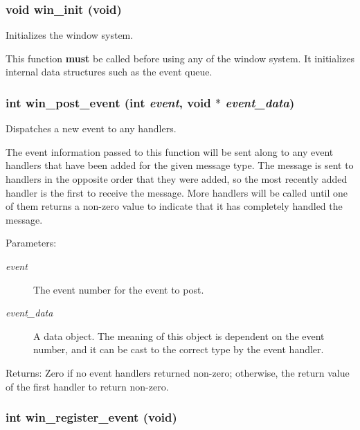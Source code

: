 \subsubsection{\setlength{\rightskip}{0pt plus 5cm}void win\_\-init (void)}\label{winevent_8h_a2}


Initializes the window system. 

This function {\bf must} be called before using any of the window system. It initializes internal data structures such as the event queue. 
\subsubsection{\setlength{\rightskip}{0pt plus 5cm}int win\_\-post\_\-event (int {\em event}, void $\ast$ {\em event\_\-data})}\label{winevent_8h_a4}


Dispatches a new event to any handlers. 

The event information passed to this function will be sent along to any event handlers that have been added for the given message type. The message is sent to handlers in the opposite order that they were added, so the most recently added handler is the first to receive the message. More handlers will be called until one of them returns a non-zero value to indicate that it has completely handled the message.

\begin{Desc}
\item[Parameters:]
\begin{description}
\item[{\em event}]The event number for the event to post.\item[{\em event\_\-data}]A data object. The meaning of this object is dependent on the event number, and it can be cast to the correct type by the event handler.\end{description}
\end{Desc}
\begin{Desc}
\item[Returns:]Zero if no event handlers returned non-zero; otherwise, the return value of the first handler to return non-zero. \end{Desc}
\subsubsection{\setlength{\rightskip}{0pt plus 5cm}int win\_\-register\_\-event (void)}\label{winevent_8h_a3}



